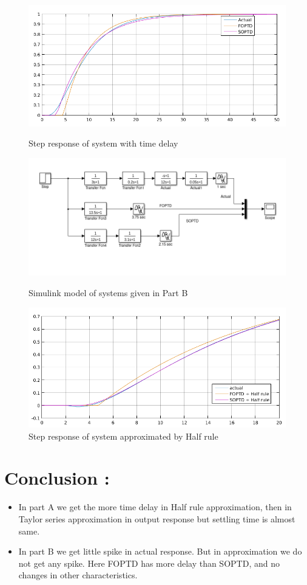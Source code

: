 \message{ !name(lab1.tex)}\documentclass[a4paper,12pt,openany]{book}
\begin{document}
  \begin{figure}[H]
    \centering
    \includegraphics[width=165mm, scale=0.95]{lab04part11.png}
    \caption{Step response of system with time delay}
   \includegraphics[width=165mm,scale=0.85]{lab04part20.png}
   \caption{Simulink model of systems given in Part B}
  \includegraphics[width=165mm,scale=0.85]{lab04part21.png}
  \caption{Step response of system approximated by Half rule}
  \end{figure}
\section{Conclusion : }
\begin{itemize}
  \item In part A we get the more time delay in Half rule approximation, then in Taylor series
approximation in output response but settling time is almost same.
\item In part B we get little spike in actual response. But in approximation we do not get any
spike. Here FOPTD has more delay than SOPTD, and no changes in other characteristics.
\end{itemize}
\end{document}
